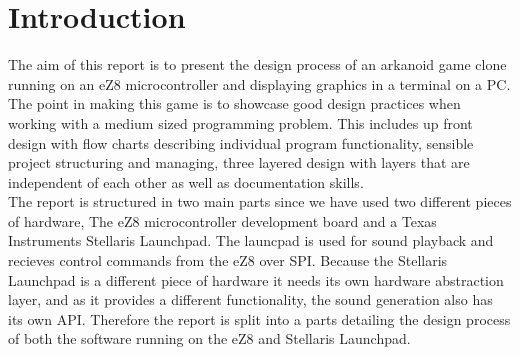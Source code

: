 \section{Introduction}
The aim of this report is to present the design process of an arkanoid game clone running
on an eZ8 microcontroller and displaying graphics in a terminal on a PC. The point in
making this game is to showcase good design practices when working with a medium sized
programming problem. This includes up front design with flow charts describing individual
program functionality, sensible project structuring and managing, three layered design
with layers that are independent of each other as well as documentation skills. \\

The report is structured in two main parts since we have used two different pieces of hardware,
The eZ8 microcontroller development board and a Texas Instruments Stellaris Launchpad. The
launcpad is used for sound playback and recieves control commands from the eZ8 over SPI.
Because the Stellaris Launchpad is a different piece of hardware it needs its own 
hardware abstraction layer, and as it provides a different functionality, the sound 
generation also has its own API. Therefore the report is split into a parts detailing
the design process of both the software running on the eZ8 and Stellaris Launchpad. \\

